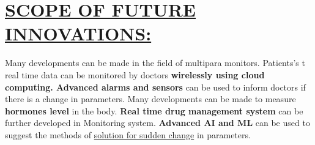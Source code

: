 \documentclass[12pt, monotype corsiva]{article}
\begin{document}
\section{\underline{SCOPE OF FUTURE INNOVATIONS:}}
Many developments can be made in the field of multipara monitors. Patients’s t real time data can be monitored by doctors \textbf{wirelessly using cloud computing. Advanced alarms and sensors} can be used to inform doctors if there is a change in parameters. 
Many developments can be made to measure \textbf{hormones level} in the body. 
\textbf{Real time drug management system} can be further developed in Monitoring system.
\textbf{Advanced AI and ML} can be used to suggest the methods of \underline{solution for sudden change} in parameters. 
\end{document}
